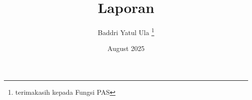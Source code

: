 \documentclass[12pt, a4paper, oneside]{book}
\begin{document}
\frontmatter
\title{Laporan}
\author{Baddri Yatul Ula \thanks{terimakasih kepada Fungsi PAS}}
\date{August 2025}

\maketitle

\pagestyle{frontstyle}





\tableofcontents
\listoffigures
\listoftables

\mainmatter
{}
\pagestyle{mainstyle}







\backmatter


\end{document}
